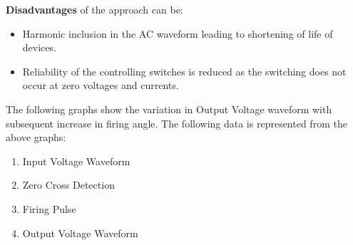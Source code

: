         	\textbf{Disadvantages} of the approach can be:
        	\begin{itemize}
        		\item Harmonic inclusion in the AC waveform leading to shortening of life of devices.
        		\item Reliability of the controlling switches is reduced as the switching does not occur at zero voltages and currents.
       		\end{itemize}
       	
        	The following graphs show the variation in Output Voltage waveform with subsequent increase in firing angle. The following data is represented from the above graphs:
        	\begin{enumerate}
        		\item Input Voltage Waveform
        		\item Zero Cross Detection 
        		\item Firing Pulse
        		\item Output Voltage Waveform
        	\end{enumerate}
        
